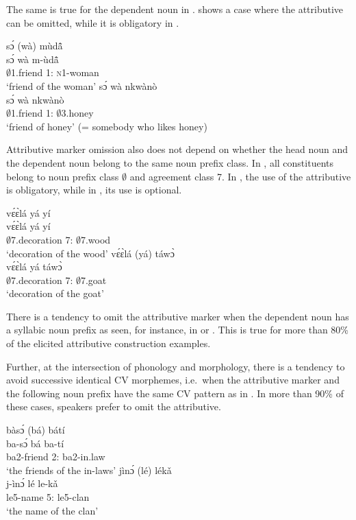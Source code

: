 \noindent The same is true for the dependent noun in .  shows a case where the attributive can be omitted, while it is obligatory in .

\ea\label{R2}
\ea \label{R21}
  \glll     sɔ́ (wà) mùdã̂ \\
  sɔ́ wà m-ùdã̂ \\
               $\emptyset$1.friend 1:{\ATT}  \textsc{n}1-woman \\
    \trans `friend of the woman'
\ex\label{R22}
 \glll     sɔ́ wà nkwànò \\
 sɔ́ wà nkwànò \\
               $\emptyset$1.friend 1:{\ATT} $\emptyset$3.honey \\
    \trans `friend of honey' (= somebody who likes honey)
\z
\z

\noindent Attributive marker omission also does not depend on whether the head noun and the dependent noun belong to the same noun prefix class. In , all constituents belong to noun prefix class $\emptyset$ and agreement class 7. In , the use of the attributive is obligatory, while in , its use is optional.

\ea\label{7}
\ea \label{71x}
  \glll    vɛ́ɛ̀lá yá yí \\
  vɛ́ɛ̀lá yá yí \\
              $\emptyset$7.decoration 7:{\ATT} $\emptyset$7.wood \\
    \trans `decoration of the wood'
\ex\label{72x}
 \glll vɛ́ɛ̀lá (yá) táwɔ̀ \\ 
 vɛ́ɛ̀lá yá táwɔ̀  \\
             $\emptyset$7.decoration 7:{\ATT} $\emptyset$7.goat   \\
    \trans `decoration of the goat'
\z
\z

There is a  tendency to omit the attributive marker when the dependent noun has a syllabic noun prefix as seen, for instance, in  or . This is true for more than 80\% of the elicited attributive construction examples.

Further, at the intersection of phonology and morphology, there is a tendency to avoid successive identical CV morphemes, i.e.~when the attributive marker and the following noun prefix have the same CV pattern as in . In more than 90\% of these cases, speakers prefer to omit the attributive.

\ea\label{double}
\ea \label{double1}
  \glll  bàsɔ́ (bá) bátí \\
  ba-sɔ́ bá ba-tí \\
               ba2-friend 2:{\ATT} ba2-in.law \\
    \trans `the friends of the in-laws'
\ex\label{double2}
 \glll  jìnɔ́ (lé) lékǎ \\
 j-ìnɔ́ lé le-kǎ \\
             le5-name 5:{\ATT} le5-clan   \\
    \trans `the name of the clan'
\z
\z

